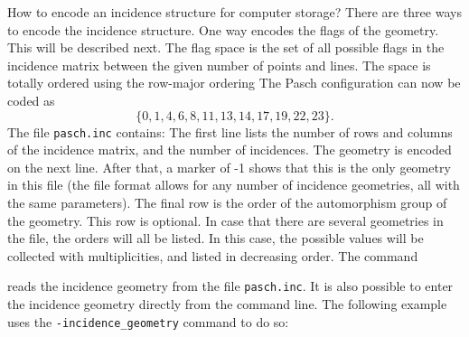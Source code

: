 How to encode an incidence structure for computer storage?
There are three ways to encode the incidence structure. 
One way encodes the flags of the geometry.
This will be described next.
The flag space is the set of all possible flags in the incidence matrix between the given number of points and lines.
The space is totally ordered 
using the row-major ordering
The Pasch configuration can now be coded as 
$$
\{0,1,4,6,8,11,13,14,17,19,22,23\}.
$$
The file \verb'pasch.inc' contains:
The first line lists the number of rows and columns of the incidence matrix, and the number of incidences. 
The geometry is encoded on the next line. After that, a marker of -1 shows that this is the only 
geometry in this file (the file format allows for any number of incidence geometries, all with the same parameters).
The final row is the order of the automorphism group of the geometry. 
This row is optional. In case that there are several geometries in the file, 
the orders will all be listed. In this case, the possible values will be 
collected with multiplicities, and listed in decreasing order.
The command 


reads the incidence geometry from the file \verb'pasch.inc'.
It is also possible to enter the incidence geometry directly from the command line. The following example 
uses the \verb'-incidence_geometry' command to do so:





